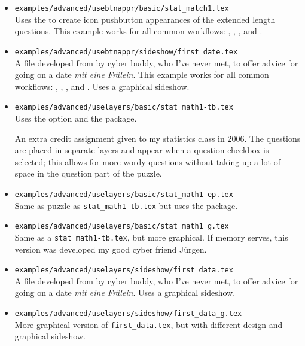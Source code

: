\documentclass{article}
\def\FmtMP#1{\marginpar{\slshape\raggedleft\small#1}}
\begin{document}
\begin{itemize}
\item \texttt{examples/advanced/usebtnappr/basic/stat\_match1.tex}\FmtMP{\texttt{usebtnappr} folder}\\
    Uses the  to create icon pushbutton appearances of the
    extended length questions. This example works for all common workflows:
    , , , and
    .

\item \texttt{examples/advanced/usebtnappr/sideshow/first\_date.tex}\\
    A file developed from by cyber buddy, who I've never met,
    to offer advice for going on a date \textsl{mit eine
    Fr\"{a}lein}. This example works for all common workflows:
    , , , and
    . Uses a graphical sideshow.

\item \texttt{examples/advanced/uselayers/basic/stat\_math1-tb.tex}\FmtMP{\texttt{uselayers} folder}\\
    Uses the  option and the  package.

    An extra credit assignment given to my statistics class in 2006. The
    questions are placed in separate layers and appear when a question
    checkbox is selected; this allows for more wordy questions without
    taking up a lot of space in the question part of the puzzle.

\item \texttt{examples/advanced/uselayers/basic/stat\_math1-ep.tex}\\
    Same as puzzle as \texttt{stat\_math1-tb.tex} but uses the
     package.

\item \texttt{examples/advanced/uselayers/basic/stat\_math1\_g.tex}\\ Same as a
    \texttt{stat\_math1-tb.tex}, but more graphical. If memory serves, this
    version was developed my good cyber friend J\"{u}rgen.

\item \texttt{examples/advanced/uselayers/sideshow/first\_data.tex}\\ A file developed
    from by cyber buddy, who I've never met, to offer advice for going on a
    date \textsl{mit eine Fr\"{a}lein}. Uses a graphical sideshow.

\item \texttt{examples/advanced/uselayers/sideshow/first\_data\_g.tex}\\
    More graphical version of \texttt{first\_data.tex}, but with different
    design and graphical sideshow.
\end{itemize}
\end{document}
